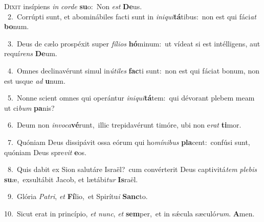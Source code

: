\lettrine{\initial\textcolor{\initialcolor}{D}}{ixit} insípiens \textit{in} \textit{cor}\-\textit{de} \textbf{su}\-o:~\star Non \textit{est} \textbf{De}\-us.\\
{\numbfont\textcolor{\numbcolor}{~2.}}~Corrúpti sunt, et abominábiles facti sunt in \textit{in}\-\textit{i}\textit{qui}\textbf{tá}tibus:~\star non est qui fáci\textit{at} \textbf{bo}\-num.\par
{\numbfont\textcolor{\numbcolor}{~3.}}~Deus de cælo prospéxit super \textit{fí}\-\textit{li}\textit{os} \textbf{hó}\-minum:~\star ut vídeat si est intélligens, aut requí\textit{rens} \textbf{De}\-um.\par
{\numbfont\textcolor{\numbcolor}{~4.}}~Omnes declinavérunt simul in\-\textit{ú}\-\textit{ti}\textit{les} \textbf{fac}\-ti sunt:~\star non est qui fáciat bonum, non est usque \textit{ad} \textbf{u}\-num.\par
{\numbfont\textcolor{\numbcolor}{~5.}}~Nonne scient omnes qui operántur \textit{in}\-\textit{i}\textit{qui}\textbf{tá}tem:~\star qui dévorant plebem meam ut ci\textit{bum} \textbf{pa}\-nis?\par
{\numbfont\textcolor{\numbcolor}{~6.}}~Deum non \textit{in}\-\textit{vo}\textit{ca}\textbf{vé}runt,~\star illic trepidavérunt timóre, ubi non e\textit{rat} \textbf{ti}\-mor.\par
{\numbfont\textcolor{\numbcolor}{~7.}}~Quóniam Deus dissipávit ossa eórum qui ho\-\textit{mí}\-\textit{ni}\textit{bus} \textbf{pla}\-cent:~\star confúsi sunt, quóniam Deus spre\textit{vit} \textbf{e}\-os.\par
{\numbfont\textcolor{\numbcolor}{~8.}}~Quis dabit ex Sion salutáre Israël?~\dagger cum convérterit Deus captivitá\textit{tem} \textit{ple}\-\textit{bis} \textbf{su}\-æ,~\star exsultábit Jacob, et lætábi\textit{tur} \textbf{Is}\-raël.\par
{\numbfont\textcolor{\numbcolor}{~9.}}~Glória \textit{Pa}\-\textit{tri}, \textit{et} \textbf{Fí}\-lio,~\star et Spirítu\textit{i} \textbf{Sanc}\-to.\par
{\numbfont\textcolor{\numbcolor}{10.}}~Sicut erat in princípio, \textit{et} \textit{nunc}\-, \textit{et} \textbf{sem}\-per,~\star et in sǽcula sæculó\-\textit{rum}\-. \textbf{A}\-men.\par
